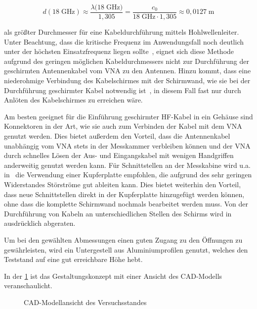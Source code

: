 \begin{equation}
    d(18\;\si{\giga\hertz}) \approx \frac{\lambda(18\;\si{\giga\hertz)}}{1,305} = \frac{c_0}{18\;\si{\giga\hertz}\cdot 1,305} \approx 0,0127 \; \si{\meter}
\end{equation}

als größter Durchmesser für eine Kabeldurchführung mittels Hohlwellenleiter. Unter Beachtung, dass die kritische Frequenz im Anwendungsfall noch deutlich unter der höchsten Einsatzfrequenz liegen sollte~\cite{EM_Schirmung}, eignet sich diese Methode aufgrund des geringen möglichen Kabeldurchmessers nicht zur Durchführung der geschirmten Antennenkabel vom \ac{VNA} zu den Antennen. Hinzu kommt, dass eine niederohmige Verbindung des Kabelschirmes mit der Schirmwand, wie sie bei der Durchführung geschirmter Kabel notwendig ist~\cite{EM_Schirmung, EMV}, in diesem Fall fast nur durch Anlöten des Kabelschirmes zu erreichen wäre.
\par
\vspace{\linespace}
Am besten geeignet für die Einführung geschirmter HF-Kabel in ein Gehäuse sind Konnektoren in der Art, wie sie auch zum Verbinden der Kabel mit dem \ac{VNA} genutzt werden. Dies bietet außerdem den Vorteil, dass die Antennenkabel unabhängig vom \ac{VNA} stets in der Messkammer verbleiben können und der \ac{VNA} durch schnelles Lösen der Aus- und Eingangskabel mit wenigen Handgriffen anderweitig genutzt werden kann. Für Schnittstellen an der Messkabine wird u.a. in~\cite{EM_Schirmung, EMV} die Verwendung einer Kupferplatte empfohlen, die aufgrund des sehr geringen Widerstandes Störströme gut ableiten kann. Dies bietet weiterhin den Vorteil, dass neue Schnittstellen direkt in der Kupferplatte hinzugefügt werden können, ohne dass die komplette Schirmwand nochmals bearbeitet werden muss. Von der Durchführung von Kabeln an unterschiedlichen Stellen des Schirms wird in~\cite{EM_Schirmung, EMV, Design_of_shielded_enclosures} ausdrücklich abgeraten. 
\par
\vspace{\linespace}
Um bei den gewählten Abmessungen einen guten Zugang zu den Öffnungen zu gewährleisten, wird ein Untergestell aus Aluminiumprofilen genutzt, welches den Teststand auf eine gut erreichbare Höhe hebt.
\par
\vspace{\linespace}
In der \Abb\ref{fig:3_Entwurf_CAD} ist das Gestaltungskonzept mit einer Ansicht des CAD-Modells veranschaulicht. 


\begin{figure}
    \centering
    \caption{CAD-Modellansicht des Versuchsstandes}
    \label{fig:3_Entwurf_CAD}
\end{figure}
















